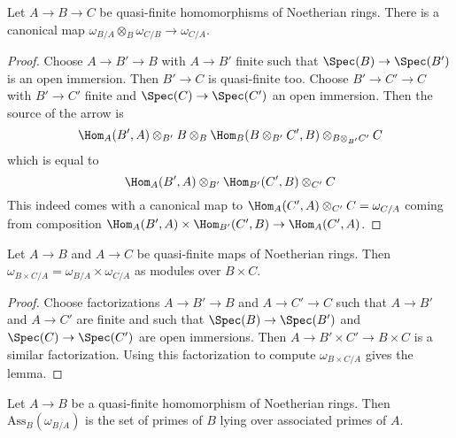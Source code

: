 \begin{lemma}
\label{lemma-dualizing-composition}
Let $A \to B \to C$ be quasi-finite homomorphisms of Noetherian rings.
There is a canonical map
$\omega_{B/A} \otimes_B \omega_{C/B} \to \omega_{C/A}$.
\end{lemma}

\begin{proof}
Choose $A \to B' \to B$ with $A \to B'$ finite such that
$\Spec(B) \to \Spec(B')$ is an open immersion. Then
$B' \to C$ is quasi-finite too. Choose $B' \to C' \to C$
with $B' \to C'$ finite and $\Spec(C) \to \Spec(C')$ an
open immersion. Then the source of the arrow is
$$
\Hom_A(B', A) \otimes_{B'} B \otimes_B
\Hom_B(B \otimes_{B'} C', B) \otimes_{B \otimes_{B'} C'} C
$$
which is equal to
$$
\Hom_A(B', A) \otimes_{B'}
\Hom_{B'}(C', B) \otimes_{C'} C
$$
This indeed comes with a canonical map to
$\Hom_A(C', A) \otimes_{C'} C = \omega_{C/A}$
coming from composition
$\Hom_A(B', A) \times \Hom_{B'}(C', B) \to \Hom_A(C', A)$.
\end{proof}

\begin{lemma}
\label{lemma-dualizing-product}
Let $A \to B$ and $A \to C$ be quasi-finite maps of Noetherian rings.
Then $\omega_{B \times C/A} = \omega_{B/A} \times \omega_{C/A}$
as modules over $B \times C$.
\end{lemma}

\begin{proof}
Choose factorizations $A \to B' \to B$ and $A \to C' \to C$ such that
$A \to B'$ and $A \to C'$ are finite and such that $\Spec(B) \to \Spec(B')$
and $\Spec(C) \to \Spec(C')$ are open immersions. Then
$A \to B' \times C' \to B \times C$ is a similar factorization.
Using this factorization to compute $\omega_{B \times C/A}$
gives the lemma.
\end{proof}

\begin{lemma}
\label{lemma-dualizing-associated-primes}
Let $A \to B$ be a quasi-finite homomorphism of Noetherian rings.
Then $\text{Ass}_B(\omega_{B/A})$ is the set of primes of $B$
lying over associated primes of $A$.
\end{lemma}

